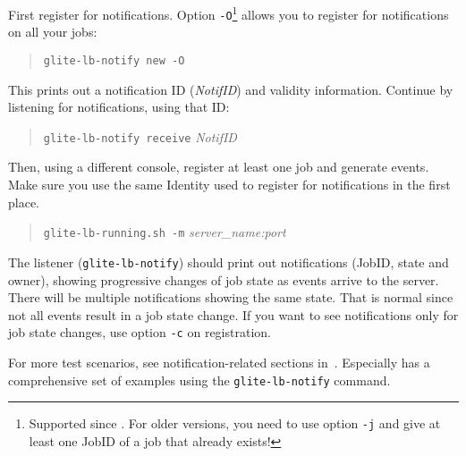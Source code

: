 \how
First register for notifications. Option \texttt{-O}\footnote{Supported since . For older versions, you need to use option \texttt{-j} and give at least one JobID of a job that already exists!} allows you to register for notifications on all your jobs:
\begin{quote}
\texttt{glite-lb-notify new -O}
\end{quote}
This prints out a notification ID (\emph{NotifID}) and validity information. Continue by listening for notifications, using that ID:
\begin{quote}
\texttt{glite-lb-notify receive} \emph{NotifID}
\end{quote}
Then, using a different console, register at least one job and generate events. Make sure you use the same Identity used to register for notifications in the first place.
\begin{quote}
\texttt{glite-lb-running.sh -m} \emph{server\_name:port}
\end{quote}

\result
The listener (\texttt{glite-lb-notify}) should print out notifications (JobID, state and owner), showing progressive changes of job state as events arrive to the server. There will be multiple notifications showing the same state. That is normal since not all events result in a job state change. If you want to see notifications only for job state changes, use option \texttt{-c} on registration.

For more test scenarios, see notification-related sections in~\cite{lbug,lbtp}. Especially \cite{lbug} has a comprehensive set of examples using the \texttt{glite-lb-notify} command.
